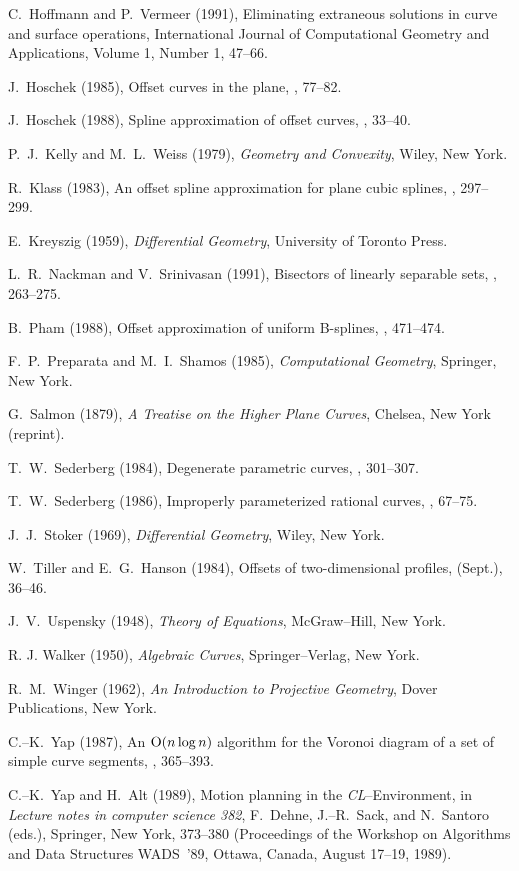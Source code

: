 \begin{thebibliography}{99}
C.~Hoffmann and P.~Vermeer (1991),
Eliminating extraneous solutions in curve and surface operations,
International Journal of Computational Geometry and Applications,
Volume 1, Number 1, 47--66.

J.~Hoschek (1985), Offset curves in the plane, , 77--82.

J.~Hoschek (1988), Spline approximation of offset curves, ,
33--40.

P.~J.~Kelly and M.~L.~Weiss (1979), {\it Geometry and Convexity}, Wiley,
New York.

R.~Klass (1983), An offset spline approximation for plane cubic
splines, , 297--299.

E.~Kreyszig (1959), {\it Differential Geometry}, University of
Toronto Press.

L.~R.~Nackman and V.~Srinivasan (1991), Bisectors of linearly
separable sets, , 263--275.

B.~Pham (1988), Offset approximation of uniform B-splines,
, 471--474.

F.~P.~Preparata and M.~I.~Shamos (1985), {\it Computational
Geometry}, Springer, New York.

G.~Salmon (1879), {\it A Treatise on the Higher Plane Curves},
Chelsea, New York (reprint).

T.~W.~Sederberg (1984), Degenerate parametric curves, ,
301--307.

T.~W.~Sederberg (1986), Improperly parameterized rational curves,
, 67--75.

J.~J.~Stoker (1969), {\it Differential Geometry}, Wiley, New York.

W.~Tiller and E.~G.~Hanson (1984), Offsets of two-dimensional
profiles,  (Sept.), 36--46.

J.~V.~Uspensky (1948), {\it Theory of Equations}, McGraw--Hill,
New York.

R. J. Walker (1950),
{\it Algebraic Curves},
Springer--Verlag, New York.

R.~M.~Winger (1962), {\it An Introduction to Projective Geometry},
Dover Publications, New York.

C.--K.~Yap (1987), An ${\rm O}(n\log n)$ algorithm for the Voronoi
diagram of a set of simple curve segments, , 365--393.

C.--K.~Yap and H.~Alt (1989), Motion planning in the {\it
CL\/}--Environment, in {\it Lecture notes in computer science 382},
F.~Dehne, J.--R.~Sack, and N.~Santoro (eds.), Springer, New York,
373--380 (Proceedings of the Workshop on Algorithms and Data
Structures WADS~'89, Ottawa, Canada, August 17--19, 1989).

\end{thebibliography}




